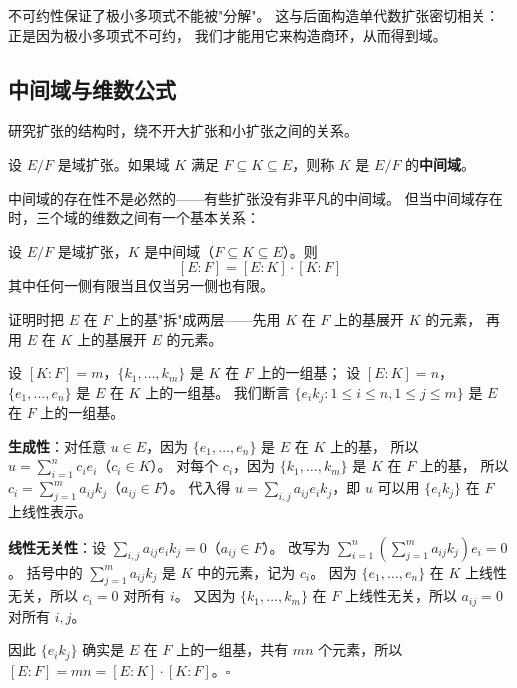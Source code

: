 不可约性保证了极小多项式不能被"分解"。
这与后面构造单代数扩张密切相关：正是因为极小多项式不可约，
我们才能用它来构造商环，从而得到域。

\subsection{中间域与维数公式}

研究扩张的结构时，绕不开大扩张和小扩张之间的关系。

\begin{definition}[中间域]\label{def:intermediate-field}
设 $E/F$ 是域扩张。如果域 $K$ 满足 $F \subseteq K \subseteq E$，则称 $K$ 是 $E/F$ 的\textbf{中间域}。
\end{definition}

中间域的存在性不是必然的——有些扩张没有非平凡的中间域。
但当中间域存在时，三个域的维数之间有一个基本关系：

\begin{lemma}[维数公式]\label{lem:tower-law}
设 $E/F$ 是域扩张，$K$ 是中间域（$F \subseteq K \subseteq E$）。则
\[[E:F] = [E:K] \cdot [K:F]\]
其中任何一侧有限当且仅当另一侧也有限。
\end{lemma}

证明时把 $E$ 在 $F$ 上的基"拆"成两层——先用 $K$ 在 $F$ 上的基展开 $K$ 的元素，
再用 $E$ 在 $K$ 上的基展开 $E$ 的元素。

设 $[K:F] = m$，$\{k_1, \ldots, k_m\}$ 是 $K$ 在 $F$ 上的一组基；
设 $[E:K] = n$，$\{e_1, \ldots, e_n\}$ 是 $E$ 在 $K$ 上的一组基。
我们断言 $\{e_i k_j : 1 \leq i \leq n, 1 \leq j \leq m\}$ 是 $E$ 在 $F$ 上的一组基。

\textbf{生成性}：对任意 $u \in E$，因为 $\{e_1, \ldots, e_n\}$ 是 $E$ 在 $K$ 上的基，
所以 $u = \sum_{i=1}^n c_i e_i$（$c_i \in K$）。
对每个 $c_i$，因为 $\{k_1, \ldots, k_m\}$ 是 $K$ 在 $F$ 上的基，
所以 $c_i = \sum_{j=1}^m a_{ij} k_j$（$a_{ij} \in F$）。
代入得 $u = \sum_{i,j} a_{ij} e_i k_j$，即 $u$ 可以用 $\{e_i k_j\}$ 在 $F$ 上线性表示。

\textbf{线性无关性}：设 $\sum_{i,j} a_{ij} e_i k_j = 0$（$a_{ij} \in F$）。
改写为 $\sum_{i=1}^n \left(\sum_{j=1}^m a_{ij} k_j\right) e_i = 0$。
括号中的 $\sum_{j=1}^m a_{ij} k_j$ 是 $K$ 中的元素，记为 $c_i$。
因为 $\{e_1, \ldots, e_n\}$ 在 $K$ 上线性无关，所以 $c_i = 0$ 对所有 $i$。
又因为 $\{k_1, \ldots, k_m\}$ 在 $F$ 上线性无关，所以 $a_{ij} = 0$ 对所有 $i, j$。

因此 $\{e_i k_j\}$ 确实是 $E$ 在 $F$ 上的一组基，共有 $mn$ 个元素，所以 $[E:F] = mn = [E:K] \cdot [K:F]$。$\square$

